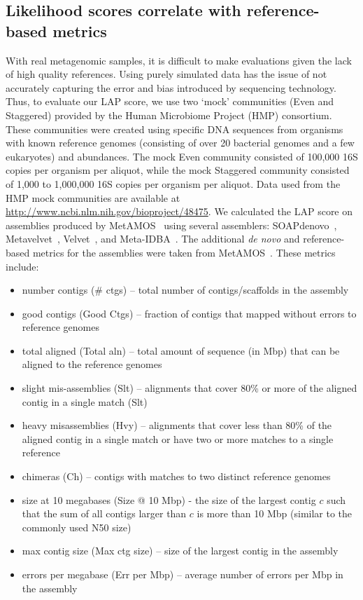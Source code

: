 \subsection{Likelihood scores correlate with reference-based metrics}


With real metagenomic samples, it is difficult to make evaluations given the lack of high quality references.
Using purely simulated data has the issue of not accurately capturing the error and bias introduced by sequencing technology.
Thus, to evaluate our LAP score, we use two `mock' communities (Even and Staggered) provided by the Human Microbiome Project (HMP) consortium\cite{mitreva2012structure,methe2012framework}.
These communities were created using specific DNA sequences from organisms with known reference genomes (consisting of over 20 bacterial genomes and a few eukaryotes) and abundances.
The mock Even community consisted of 100,000 16S copies per organism per aliquot, while the mock Staggered community consisted of 1,000 to 1,000,000 16S copies per organism per aliquot.
Data used from the HMP mock communities are available at \url{http://www.ncbi.nlm.nih.gov/bioproject/48475}.
We calculated the LAP score on assemblies produced by MetAMOS~\cite{treangen2013metamos} using several assemblers: SOAPdenovo~\cite{SOAPdenovo}, Metavelvet~\cite{namiki2012metavelvet}, Velvet~\cite{Velvet}, and Meta-IDBA~\cite{peng2011meta}.
The additional \emph{de novo} and reference-based metrics for the assemblies were taken from MetAMOS~\cite{treangen2013metamos}.  These metrics include:
   \begin{itemize}
   \item number contigs (\# ctgs) -- total number of contigs/scaffolds in the assembly
   \item good contigs (Good Ctgs) -- fraction of contigs that mapped without errors to reference genomes
   \item total aligned (Total aln) -- total amount of sequence (in Mbp) that can be aligned to the reference genomes
   \item slight mis-assemblies (Slt) -- alignments that cover 80\% or more of the aligned contig in a single match (Slt)
   \item heavy misassemblies (Hvy) -- alignments that cover less than 80\% of the aligned contig in a single match or have two or more matches to a single reference
   \item chimeras (Ch) -- contigs with matches to two distinct reference genomes
   \item size at 10 megabases (Size @ 10 Mbp) - the size of the largest contig $c$ such that the sum of all contigs larger than $c$ is more than 10 Mbp (similar to the commonly used N50 size)
   \item max contig size (Max ctg size) -- size of the largest contig in the assembly
   \item errors per megabase (Err per Mbp) -- average number of errors per Mbp in the assembly
   \end{itemize}

